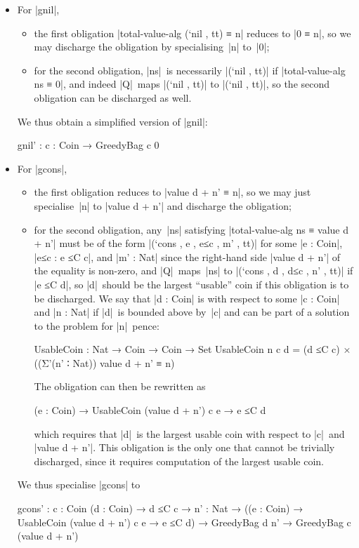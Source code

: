 \begin{itemize}
\item For |gnil|,
\begin{itemize}
\item the first obligation |total-value-alg (`nil , tt) ≡ n| reduces to |0 ≡ n|, so we may discharge the obligation by specialising~|n| to~|0|;
\item for the second obligation, |ns|~is necessarily |(`nil , tt)| if |total-value-alg ns ≡ 0|, and indeed |Q|~maps |(`nil , tt)| to |(`nil , tt)|, so the second obligation can be discharged as well.
\end{itemize}
We thus obtain a simplified version of |gnil|:
\begin{code}
gnil' : {c : Coin} → GreedyBag c 0
\end{code}
\item For |gcons|,
\begin{itemize}
\item the first obligation reduces to |value d + n' ≡ n|, so we may just specialise~|n| to |value d + n'| and discharge the obligation;
\item for the second obligation, any~|ns| satisfying |total-value-alg ns ≡ value d + n'| must be of the form |(`cons , e , e≤c , m' , tt)| for some |e : Coin|, |e≤c : e ≤C c|, and |m' : Nat| since the right-hand side |value d + n'| of the equality is non-zero, and |Q|~maps~|ns| to |(`cons , d , d≤c , n' , tt)| if |e ≤C d|, so |d|~should be the largest ``usable'' coin if this obligation is to be discharged.
We say that |d : Coin| is  with respect to some |c : Coin| and |n : Nat| if |d|~is bounded above by~|c| and can be part of a solution to the problem for |n|~pence:
\begin{code}
UsableCoin : Nat → Coin → Coin → Set
UsableCoin n c d = (d ≤C c) × ((Σ'(n' ∶ Nat)) value d + n' ≡ n)
\end{code}
The obligation can then be rewritten as
\begin{code}
(e : Coin) → UsableCoin (value d + n') c e → e ≤C d
\end{code}
which requires that |d|~is the largest usable coin with respect to |c|~and |value d + n'|.
This obligation is the only one that cannot be trivially discharged, since it requires computation of the largest usable coin.
\end{itemize}
We thus specialise |gcons| to
\begin{code}
gcons' :  {c : Coin} (d : Coin) → d ≤C c →
          {n' : Nat} →
          ((e : Coin) → UsableCoin (value d + n') c e → e ≤C d) →
          GreedyBag d n' → GreedyBag c (value d + n')
\end{code}
\end{itemize}
